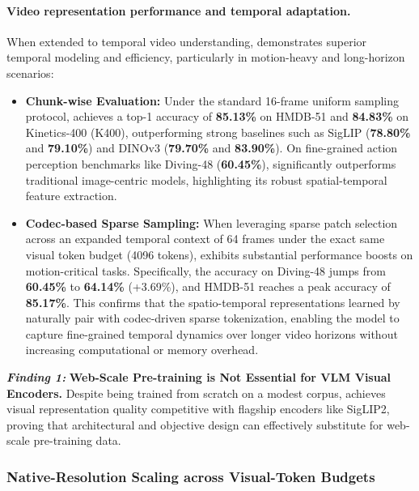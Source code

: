 \paragraph{Video representation performance and temporal adaptation.}
When extended to temporal video understanding, \magevit demonstrates superior temporal modeling and efficiency, particularly in motion-heavy and long-horizon scenarios:
\begin{itemize}[leftmargin=*]
    \item \textbf{Chunk-wise Evaluation:} Under the standard 16-frame uniform sampling protocol, \magevit achieves a top-1 accuracy of \textbf{85.13\%} on HMDB-51 and \textbf{84.83\%} on Kinetics-400 (K400), outperforming strong baselines such as SigLIP (\textbf{78.80\%} and \textbf{79.10\%}) and DINOv3 (\textbf{79.70\%} and \textbf{83.90\%}). On fine-grained action perception benchmarks like Diving-48 (\textbf{60.45\%}), \magevit significantly outperforms traditional image-centric models, highlighting its robust spatial-temporal feature extraction.
    \item \textbf{Codec-based Sparse Sampling:} When leveraging sparse patch selection across an expanded temporal context of 64 frames under the exact same visual token budget (4096 tokens), \magevit exhibits substantial performance boosts on motion-critical tasks. Specifically, the accuracy on Diving-48 jumps from \textbf{60.45\%} to \textbf{64.14\%} (+3.69\%), and HMDB-51 reaches a peak accuracy of \textbf{85.17\%}. This confirms that the spatio-temporal representations learned by \magevit naturally pair with codec-driven sparse tokenization, enabling the model to capture fine-grained temporal dynamics over longer video horizons without increasing computational or memory overhead.
\end{itemize}


\begin{promptbox}
\large
\textbf{\textit{Finding 1:}}
\textbf{Web-Scale Pre-training is Not Essential for VLM Visual Encoders.}
Despite being trained from scratch on a modest corpus, \magevit achieves visual representation quality competitive with flagship encoders like SigLIP2, proving that architectural and objective design can effectively substitute for web-scale pre-training data.
\end{promptbox}



\subsubsection{Native-Resolution Scaling across Visual-Token Budgets}
\label{sec:magevit_token_scaling}



